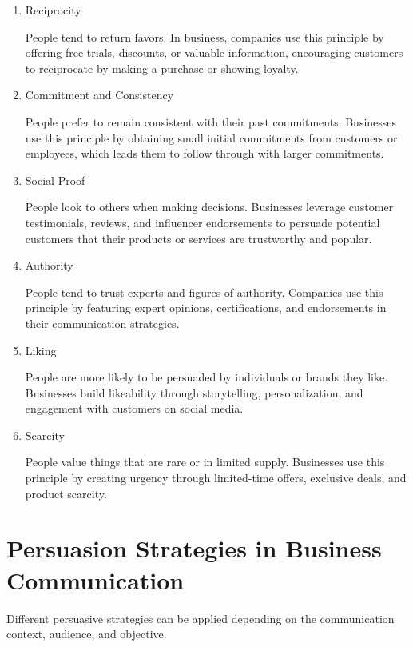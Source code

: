 \documentclass[a4paper]{article}
\begin{document}
\begin{enumerate}
\item Reciprocity

People tend to return favors. In business, companies use this principle by offering free trials, discounts, or valuable information, encouraging customers to reciprocate by making a purchase or showing loyalty.

\item Commitment and Consistency

People prefer to remain consistent with their past commitments. Businesses use this principle by obtaining small initial commitments from customers or employees, which leads them to follow through with larger commitments.

\item Social Proof

People look to others when making decisions. Businesses leverage customer testimonials, reviews, and influencer endorsements to persuade potential customers that their products or services are trustworthy and popular.

\item Authority

People tend to trust experts and figures of authority. Companies use this principle by featuring expert opinions, certifications, and endorsements in their communication strategies.

\item Liking

People are more likely to be persuaded by individuals or brands they like. Businesses build likeability through storytelling, personalization, and engagement with customers on social media.

\item Scarcity

People value things that are rare or in limited supply. Businesses use this principle by creating urgency through limited-time offers, exclusive deals, and product scarcity.
\end{enumerate}



\section{Persuasion Strategies in Business Communication}

Different persuasive strategies can be applied depending on the communication context, audience, and objective.
\end{document}
